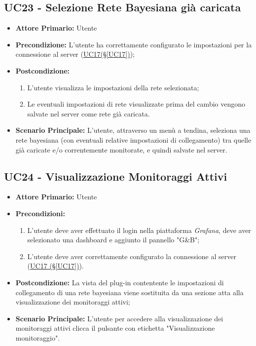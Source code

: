 \pagebreak

\subsection{UC23 - Selezione Rete Bayesiana già caricata}\label{UC23}
\begin{itemize}
	\item \textbf{Attore Primario:}  Utente
	\item \textbf{Precondizione:} L'utente ha correttamente configurato le impostazioni per la connessione al server (\hyperref[UC17]{UC17(§\ref*{UC17})});
	\item \textbf{Postcondizione:}
	\begin{enumerate}
		\item L'utente visualizza le impostazioni della rete selezionata;
		\item Le eventuali impostazioni di rete visualizzate prima del cambio vengono salvate nel server come rete già caricata.
	\end{enumerate}
	\item \textbf{Scenario Principale:} L'utente, attraverso un menù a tendina, seleziona una rete bayesiana (con eventuali relative impostazioni di collegamento) tra quelle già caricate e/o correntemente monitorate, e quindi salvate nel server.
\end{itemize}

\pagebreak

\subsection{UC24 - Visualizzazione Monitoraggi Attivi}\label{UC24}
\begin{itemize}
	\item \textbf{Attore Primario:}  Utente
	\item \textbf{Precondizioni:} 
	\begin{enumerate}
		\item L'utente deve aver effettuato il login nella piattaforma \textit{Grafana}, deve aver selezionato una dashboard e aggiunto il pannello "G\&B";
		\item L'utente deve aver correttamente configurato la connessione al server (\hyperref[UC17]{UC17 (§\ref*{UC17})}).
	\end{enumerate}
	\item \textbf{Postcondizione:} La vista del plug-in contentente le impostazioni di collegamento di una rete bayesiana viene sostituita da una sezione atta alla visualizzazione dei monitoraggi attivi;
	\item \textbf{Scenario Principale:} L'utente per accedere alla visualizzazione dei monitoraggi attivi clicca il pulsante con etichetta "Visualizzazione monitoraggio".
\end{itemize}

